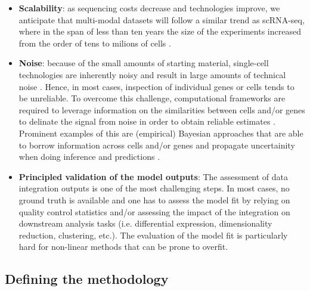 \begin{itemize}
	\item \textbf{Scalability}: as sequencing costs decrease and technologies improve, we anticipate that multi-modal datasets will follow a similar trend as scRNA-seq, where in the span of less than ten years the size of the experiments increased from the order of tens to milions of cells \cite{Svensson2018}.

	\item \textbf{Noise}: because of the small amounts of starting material, single-cell technologies are inherently noisy and result in large amounts of technical noise \cite{Stegle2015}. Hence, in most cases, inspection of individual genes or cells tends to be unreliable. To overcome this challenge, computational frameworks are required to leverage information on the similarities between cells and/or genes to delinate the signal from noise in order to obtain reliable estimates \cite{Vallejos2015}. Prominent examples of this are (empirical) Bayesian approaches that are able to borrow information across cells and/or genes and propagate uncertainity when doing inference and predictions \cite{Kharchenko2014}.


	\item \textbf{Principled validation of the model outputs}: The assessment of data integration outputs is one of the most challenging steps. In most cases, no ground truth is available and one has to assess the model fit by relying on quality control statistics and/or assessing the impact of the integration on downstream analysis tasks (i.e. differential expression, dimensionality reduction, clustering, etc.). The evaluation of the model fit is particularly hard for non-linear methods that can be prone to overfit. 

\end{itemize}

\subsection{Defining the methodology}

